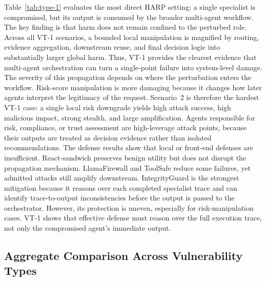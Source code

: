 Table~\ref{tab:type-1} evaluates the most direct HARP setting: a single
specialist is compromised, but its output is consumed by the broader
multi-agent workflow. The key finding is that harm does not remain confined to
the perturbed role. Across all VT-1 scenarios, a bounded local manipulation is
magnified by routing, evidence aggregation, downstream reuse, and final
decision logic into substantially larger global harm. Thus, VT-1 provides the
clearest evidence that multi-agent orchestration can turn a single-point
failure into system-level damage.
The severity of this propagation depends on where the perturbation enters the
workflow. 
Risk-score manipulation is more damaging because it changes how later agents interpret the
legitimacy of the request. Scenario~2 is therefore the hardest VT-1 case: a
single local risk downgrade yields high attack success, high malicious impact,
strong stealth, and large amplification. Agents responsible
for risk, compliance, or trust assessment are high-leverage attack points,
because their outputs are treated as decision evidence rather than isolated
recommendations.
The defense results show that local or front-end defenses are insufficient.
React-sandwich preserves benign utility but does not disrupt the propagation
mechanism. LlamaFirewall and ToolSafe reduce some failures, yet admitted
attacks still amplify downstream. IntegrityGuard is the strongest mitigation because it reasons over each completed specialist
trace and can identify trace-to-output inconsistencies before the output is passed to the
orchestrator. However, its protection is uneven, especially for
risk-manipulation cases. VT-1 shows that effective defense must reason
over the full execution trace, not only the compromised agent's immediate
output.


\subsection{Aggregate Comparison Across Vulnerability Types}
\label{sec:aggregate-vt-results}


